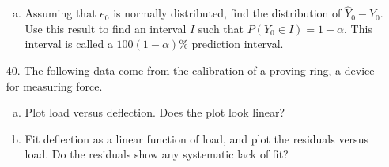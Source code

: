\documentclass{article}
\begin{document}
\begin{itemize}
\begin{enumerate}[a.]
			\item Assuming that $e_0$ is normally distributed, find the distribution of $\hat Y_0-Y_0.$ Use this result to find an interval $I$ such that $P(Y_0\in I)=1-\alpha.$ This interval is called a $100(1-\alpha)\%$ prediction interval.
				
		\end{enumerate}
		
	\item[40.] The following data come from the calibration of a proving ring, a device for measuring force.
		\begin{enumerate}[a.]
			\item Plot load versus deflection. Does the plot look linear?

			\item Fit deflection as a linear function of load, and plot the residuals versus load. Do the residuals show any systematic lack of fit?

		\end{enumerate}

\end{itemize}
\end{document}
